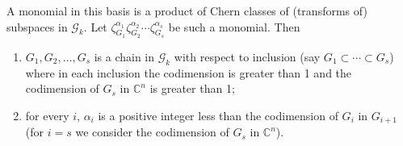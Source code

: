 \documentclass[a4paper]{amsart}
\theoremstyle{definition}
\theoremstyle{remark}
\numberwithin{equation}{section}
\begin{document}
A monomial in this basis is a product of Chern classes of  (transforms of)  subspaces in \(\mathcal G_k\). Let \(\zeta_{G_1}^{\alpha_1}\zeta_{G_2}^{\alpha_2} \cdots \zeta_{G_s}^{\alpha_s} \) be such a monomial. Then
\begin{enumerate}
\item \(G_1,G_2,\ldots, G_s\) is a chain in \(\mathcal G_k\) with respect to inclusion (say \(G_1\subset \cdots \subset G_s\)) where in each inclusion the codimension is greater than 1 and the codimension of \(G_s\) in $\mathbb C^n$ is greater than 1;
\item for every \(i\), \(\alpha_i\) is a positive integer less than the codimension of \(G_i\) in \(G_{i+1}\) (for \(i=s\) we consider the codimension of \(G_s\) in $\mathbb C^n$). 
\end{enumerate} 
\end{document}
